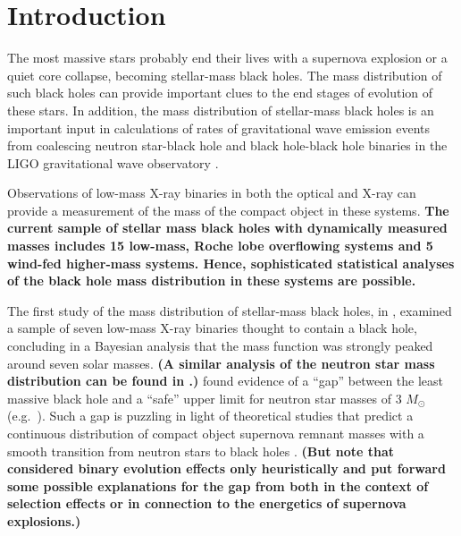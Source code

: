 \documentclass[preprint]{aastex}
\newcommand{\Msun}{M_\odot}
\newcommand{\changed}[1]{{\bf #1 }}
\begin{document}
\section{Introduction}
\label{sec:intro}

The most massive stars probably end their lives with a supernova
explosion or a quiet core collapse, becoming stellar-mass black holes.
The mass distribution of such black holes can provide important clues
to the end stages of evolution of these stars.  In addition, the mass
distribution of stellar-mass black holes is an important input in
calculations of rates of gravitational wave emission events from
coalescing neutron star-black hole and black hole-black hole binaries
in the LIGO gravitational wave observatory \citep{Abadie2010}.

Observations of low-mass X-ray binaries in both the optical and X-ray
can provide a measurement of the mass of the compact object in these
systems.  \changed{The current sample of stellar mass black holes with
  dynamically measured masses includes 15 low-mass, Roche lobe
  overflowing systems and 5 wind-fed higher-mass systems.  Hence,
  sophisticated statistical analyses of the black hole mass
  distribution in these systems are possible.}

The first study of the mass distribution of stellar-mass black holes,
in \citet{Bailyn1998}, examined a sample of seven low-mass X-ray
binaries thought to contain a black hole, concluding in a Bayesian
analysis that the mass function was strongly peaked around seven solar
masses.  \changed{(A similar analysis of the neutron star mass
  distribution can be found in \citet{Finn1994}.)}  \citet{Bailyn1998}
found evidence of a ``gap'' between the least massive black hole and a
``safe'' upper limit for neutron star masses of 3 $\Msun$ (e.g.\
\citet{Kalogera1996}).  Such a gap is puzzling in light of theoretical
studies that predict a continuous distribution of compact object
supernova remnant masses with a smooth transition from neutron stars
to black holes \citep{Fryer2001}.  \changed{(But note that
  \citet{Fryer2001} considered binary evolution effects only
  heuristically and put forward some possible explanations for the gap
  from \citet{Bailyn1998} both in the context of selection effects or
  in connection to the energetics of supernova explosions.)}
\end{document}
